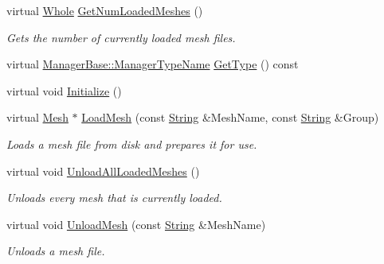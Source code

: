 \begin{DoxyCompactItemize}
virtual \hyperlink{namespaceMezzanine_adcbb6ce6d1eb4379d109e51171e2e493}{Whole} \hyperlink{classMezzanine_1_1MeshManager_a809d8b615341e55c3ed463b1e18c01db}{GetNumLoadedMeshes} ()
\begin{DoxyCompactList}\small\item\em Gets the number of currently loaded mesh files. \item\end{DoxyCompactList}\item 
virtual \hyperlink{classMezzanine_1_1ManagerBase_a08cecf5169cad3e82be81a3a159b0b6e}{ManagerBase::ManagerTypeName} \hyperlink{classMezzanine_1_1MeshManager_a120881dcf7bce1d3a30bedb426650c0e}{GetType} () const 
\item 
virtual void \hyperlink{classMezzanine_1_1MeshManager_ac03c91bea88144bcfa420411bc85f0c7}{Initialize} ()
\item 
virtual \hyperlink{classMezzanine_1_1Mesh}{Mesh} $\ast$ \hyperlink{classMezzanine_1_1MeshManager_a01fcda6b9f1363e99b6ac61e4afcb951}{LoadMesh} (const \hyperlink{namespaceMezzanine_acf9fcc130e6ebf08e3d8491aebcf1c86}{String} \&MeshName, const \hyperlink{namespaceMezzanine_acf9fcc130e6ebf08e3d8491aebcf1c86}{String} \&Group)
\begin{DoxyCompactList}\small\item\em Loads a mesh file from disk and prepares it for use. \item\end{DoxyCompactList}\item 
\hypertarget{classMezzanine_1_1MeshManager_a95b66f15b74a8eb4f8cdfab411de6289}{
virtual void \hyperlink{classMezzanine_1_1MeshManager_a95b66f15b74a8eb4f8cdfab411de6289}{UnloadAllLoadedMeshes} ()}
\label{classMezzanine_1_1MeshManager_a95b66f15b74a8eb4f8cdfab411de6289}

\begin{DoxyCompactList}\small\item\em Unloads every mesh that is currently loaded. \item\end{DoxyCompactList}\item 
virtual void \hyperlink{classMezzanine_1_1MeshManager_aa8bf0e0aad71969dd4076cd36e2e8ab3}{UnloadMesh} (const \hyperlink{namespaceMezzanine_acf9fcc130e6ebf08e3d8491aebcf1c86}{String} \&MeshName)
\begin{DoxyCompactList}\small\item\em Unloads a mesh file. \item\end{DoxyCompactList}\end{DoxyCompactItemize}

